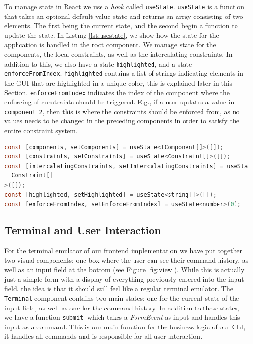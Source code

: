 \documentclass[11pt, a4paper]{article}
\begin{document}
To manage state in React we use a \textit{hook} \cite{reacthooks} called \texttt{useState}. \texttt{useState} is a function that takes an optional default value state and returns an array consisting of two elements. The first being the current state, and the second begin a function to update the state. In Listing \ref{lst:usestate}, we show how the state for the application is handled in the root component. We manage state for the components, the local constraints, as well as the intercalating constraints. In addition to this, we also have a state \texttt{highlighted}, and a state \texttt{enforceFromIndex}. \texttt{highlighted} contains a list of strings indicating elements in the GUI that are highlighted in a unique color, this is explained later in this Section. \texttt{enforceFromIndex} indicates the index of the component where the enforcing of constraints should be triggered. E.g., if a user updates a value in \texttt{component 2}, then this is where the constraints should be enforced from, as no values needs to be changed in the preceding components in order to satisfy the entire constraint system.

\begin{lstlisting}[float, language=java, caption={Using \texttt{useState} to manage state.}, label={lst:usestate}]
const [components, setComponents] = useState<IComponent[]>([]);
const [constraints, setConstraints] = useState<Constraint[]>([]);
const [intercalatingConstraints, setIntercalatingConstraints] = useState<
  Constraint[]
>([]);
const [highlighted, setHighlighted] = useState<string[]>([]);
const [enforceFromIndex, setEnforceFromIndex] = useState<number>(0);
\end{lstlisting}

\subsection{Terminal and User Interaction}
\label{sec:terminal}

For the terminal emulator of our frontend implementation we have put together two visual components: one box where the user can see their command history, as well as an input field at the bottom (see Figure \ref{fig:view}). While this is actually just a simple form with a display of everything previously entered into the input field, the idea is that it should still feel like a regular terminal emulator. The \texttt{Terminal} component contains two main states: one for the current state of the input field, as well as one for the command history. In addition to these states, we have a function \texttt{submit}, which takes a \textit{FormEvent} as input and handles this input as a command. This is our main function for the business logic of our CLI, it handles all commands and is responsible for all user interaction.
\end{document}
